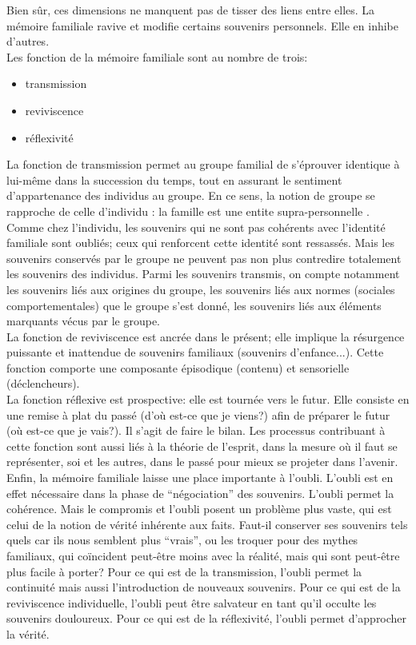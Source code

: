 \documentclass[french]{article}
\begin{document}
			Bien sûr, ces dimensions ne manquent pas de tisser des liens entre elles. La mémoire familiale ravive et modifie certains souvenirs personnels. Elle en inhibe d'autres.\\
			Les fonction de la mémoire familiale sont au nombre de trois:
			\begin{itemize}
				\item transmission
				\item reviviscence
				\item réflexivité
			\end{itemize}
			La fonction de transmission permet au groupe familial de s'éprouver identique à lui-même dans la succession du temps, tout en assurant le sentiment d'appartenance des individus au groupe. En ce sens, la notion de groupe se rapproche de celle d'individu : la famille est une entite supra-personnelle \cite{boesen2012}. Comme chez l'individu, les souvenirs qui ne sont pas cohérents avec l'identité familiale sont oubliés; ceux qui renforcent cette identité sont ressassés. Mais les souvenirs conservés par le groupe ne peuvent pas non plus contredire totalement les souvenirs des individus. Parmi les souvenirs transmis, on compte notamment les souvenirs liés aux origines du groupe, les souvenirs liés aux normes (sociales comportementales) que le groupe s'est donné, les souvenirs liés aux éléments marquants vécus par le groupe.\\
			La fonction de reviviscence est ancrée dans le présent; elle implique la résurgence puissante et inattendue de souvenirs familiaux (souvenirs d'enfance...). Cette fonction comporte une composante épisodique (contenu) et sensorielle (déclencheurs).\\
			La fonction réflexive est prospective: elle est tournée vers le futur. Elle consiste en une remise à plat du passé (d'où est-ce que je viens?) afin de préparer le futur (où est-ce que je vais?). Il s'agit de faire le bilan. Les processus contribuant à cette fonction sont aussi liés à la théorie de l'esprit, dans la mesure où il faut se représenter, soi et les autres, dans le passé pour mieux se projeter dans l'avenir. \\
			
			Enfin, la mémoire familiale laisse une place importante à l'oubli. L'oubli est en effet nécessaire dans la phase de ``négociation'' des souvenirs. L'oubli permet la cohérence. Mais le compromis et l'oubli posent un problème plus vaste, qui est celui de la notion de vérité inhérente aux faits. Faut-il conserver ses souvenirs tels quels car ils nous semblent plus ``vrais'', ou les troquer pour des mythes familiaux, qui coïncident peut-être moins avec la réalité, mais qui sont peut-être plus facile à porter? Pour ce qui est de la transmission, l'oubli permet la continuité mais aussi l'introduction de nouveaux souvenirs. Pour ce qui est de la reviviscence individuelle, l'oubli peut être salvateur en tant qu'il occulte les souvenirs douloureux. Pour ce qui est de la réflexivité, l'oubli permet d'approcher la vérité.
\end{document}
